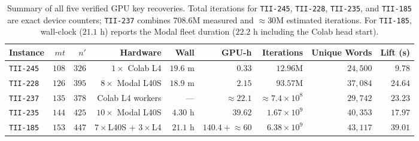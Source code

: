 \documentclass[11pt,a4paper]{article}
\begin{document}
\begin{table}[t]
\centering
\caption{Summary of all five verified GPU key recoveries. Total iterations for \texttt{TII-245}, \texttt{TII-228}, \texttt{TII-235}, and \texttt{TII-185} are exact device counters; \texttt{TII-237} combines $708.6\text{M}$ measured and $\approx 30\text{M}$ estimated iterations. For \texttt{TII-185}, wall-clock ($21.1\text{ h}$) reports the Modal fleet duration ($22.2\text{ h}$ including the Colab head start).}
\label{tab:results}
\small
\setlength{\tabcolsep}{3.5pt}
\begin{tabular}{lrrrrrrrr}
\toprule
Instance & $mt$ & $n'$ & Hardware & Wall & GPU-h & Iterations & Unique Words & Lift (s) \\
\midrule
\texttt{TII-245} & $108$ & $326$ & $1\times$ Colab L4 & $19.6\text{ m}$ & $0.33$ & $12.96\text{M}$ & $24{,}500$ & $9.78$ \\
\texttt{TII-228} & $126$ & $395$ & $8\times$ Modal L40S & $18.9\text{ m}$ & $2.15$ & $93.57\text{M}$ & $37{,}084$ & $24.64$ \\
\texttt{TII-237} & $135$ & $378$ & Colab L4 workers & --- & $\approx 22.1$ & $\approx 7.4\times 10^8$ & $29{,}742$ & $23.23$ \\
\texttt{TII-235} & $144$ & $425$ & $10\times$ Modal L40S & $4.30\text{ h}$ & $39.62$ & $1.67\times 10^9$ & $40{,}353$ & $17.97$ \\
\texttt{TII-185} & $153$ & $447$ & $7\times$L40S + $3\times$L4 & $21.1\text{ h}$ & $140.4{+}\!\approx\!60$ & $6.38\times 10^9$ & $43{,}117$ & $39.01$ \\
\bottomrule
\end{tabular}
\end{table}
\end{document}
